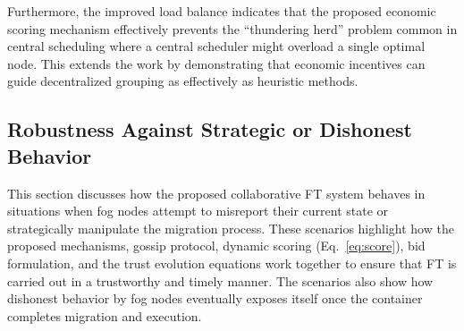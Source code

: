 \documentclass{article}
\begin{document}
Furthermore, the improved load balance indicates that the proposed economic scoring mechanism effectively prevents the ``thundering herd'' problem common in central scheduling where a central scheduler might overload a single optimal node. This extends the work \cite{mudassarDecentralizedLatencyAwareTask2020} by demonstrating that economic incentives can guide decentralized grouping as effectively as heuristic methods.

\subsection{Robustness Against Strategic or Dishonest Behavior}

This section discusses how the proposed collaborative FT system behaves in situations when fog nodes attempt to misreport their current state or strategically manipulate the migration process. These scenarios highlight how the proposed mechanisms, gossip protocol, dynamic scoring (Eq.~\ref{eq:score}), bid formulation, and the trust evolution equations work together to ensure that FT is carried out in a trustworthy and timely manner. The scenarios also show how dishonest behavior by fog nodes eventually exposes itself once the container completes migration and execution.
\end{document}
